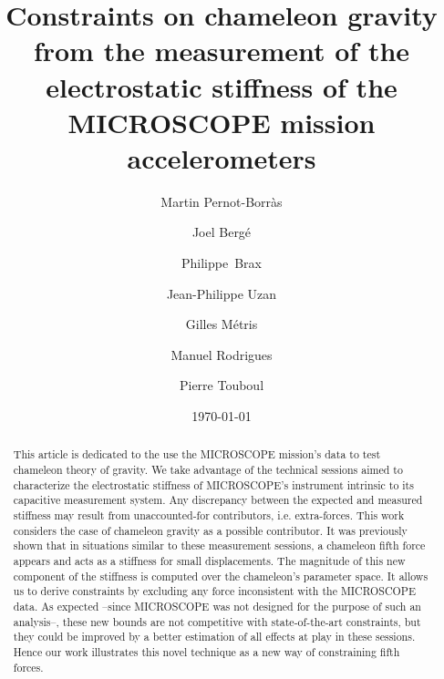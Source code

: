 \documentclass[aps,prd,twocolumn,superscriptaddress,nofootinbib,eqsecnumm,showpacs]{revtex4-1}
\renewcommand\({\left(}
\renewcommand\){\right)}
\renewcommand\[{\left[}
\renewcommand\]{\right]}
\begin{document}
\title{Constraints on chameleon gravity from the measurement of the electrostatic stiffness of the MICROSCOPE mission accelerometers}

\author{Martin Pernot-Borr\`as}

\author{Joel Berg\'e}

\author{Philippe~Brax}

\author{Jean-Philippe Uzan}

\author{Gilles M\'etris}

\author{Manuel Rodrigues}

\author{Pierre Touboul}


\date{\today}
\begin{abstract}
This article is dedicated to the use the MICROSCOPE mission's data to test chameleon theory of gravity. We take advantage of the technical sessions aimed to characterize the electrostatic stiffness of MICROSCOPE's instrument intrinsic to its capacitive measurement system. Any discrepancy between the expected and measured stiffness may result from unaccounted-for contributors, i.e. extra-forces. This work considers the case of chameleon gravity as a possible contributor. It was previously shown that in situations similar to these measurement sessions, a chameleon fifth force appears and acts as a stiffness for small displacements. The magnitude of this new component of the stiffness is computed over the chameleon's parameter space. It  allows us to derive constraints by excluding any force inconsistent with the MICROSCOPE data. As expected --since MICROSCOPE was not designed for the purpose of such an analysis--, these new bounds are not competitive with state-of-the-art constraints, but they could be improved by a better estimation of all effects at play in these sessions. Hence our work  illustrates this novel technique as a new way of constraining fifth forces.
\end{abstract}
\end{document}
